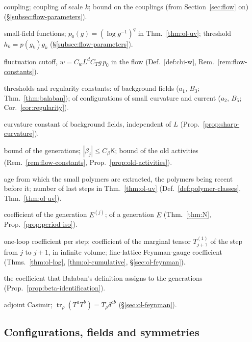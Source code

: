 {\begin{description}[font=\normalfont,style=nextline,leftmargin=10em,labelwidth=9.5em,labelsep=0.5em,itemsep=1pt,parsep=0pt,topsep=4pt]
\item[$g$, $g_k$, $\gamma$] coupling; coupling of scale $k$; bound on the couplings (from Section~\ref{sec:flow} on) (\S\ref{subsec:flow-parameters}).
\item[$p$, $p_0$, $q$, $h_k$] small-field functions; $p_0(g)=(\log g^{-1})^q$ in Thm.~\ref{thm:ol-uv}; threshold $h_k=p(g_k)g_k$ (\S\ref{subsec:flow-parameters}).
\item[$w$] fluctuation cutoff, $w=C_wL^dC_Tg\,p_0$ in the flow (Def.~\ref{def:chi-w}, Rem.~\ref{rem:flow-constants}).
\item[$a_1$, $B_3$, $a_2$, $B_5$] thresholds and regularity constants: of background fields ($a_1$, $B_3$; Thm.~\ref{thm:balaban}); of configurations of small curvature and current ($a_2$, $B_5$; Cor.~\ref{cor:regularity}).
\item[$C_*$] curvature constant of background fields, independent of $L$ (Prop.~\ref{prop:sharp-curvature}).
\item[$\mathsf K$, $C_\beta$, $C_{\rm old}$] bound of the generations; $|\beta_j|\le C_\beta\mathsf K$; bound of the old activities (Rem.~\ref{rem:flow-constants}, Prop.~\ref{prop:old-activities}).
\item[$m_0$, $m_1$] age from which the small polymers are extracted, the polymers being recent before it; number of last steps in Thm.~\ref{thm:ol-uv} (Def.~\ref{def:polymer-classes}, Thm.~\ref{thm:ol-uv}).
\item[$\beta_j$, $\beta_E$] coefficient of the generation $E^{(j)}$; of a generation $E$ (Thm.~\ref{thm:N}, Prop.~\ref{prop:period-iso}).
\item[$\beta_\infty$, $\beta^{(1)}_{j+1}$, $\beta_{\rm F}$] one-loop coefficient per step; coefficient of the marginal tensor $T^{(1)}_{j+1}$ of the step from $j$ to $j+1$, in infinite volume; fine-lattice Feynman-gauge coefficient (Thms.~\ref{thm:ol-log}, \ref{thm:ol-cumulative}, \S\ref{sec:ol-feynman}).
\item[$\beta^{\rm B}_j$] the coefficient that Ba\l aban's definition assigns to the generations (Prop.~\ref{prop:beta-identification}).
\item[$C_A$, $T_\rho$] adjoint Casimir; $\operatorname{tr}_\rho(T^aT^b)=T_\rho\delta^{ab}$ (\S\ref{sec:ol-feynman}).
\end{description}}

\subsection*{Configurations, fields and symmetries}

